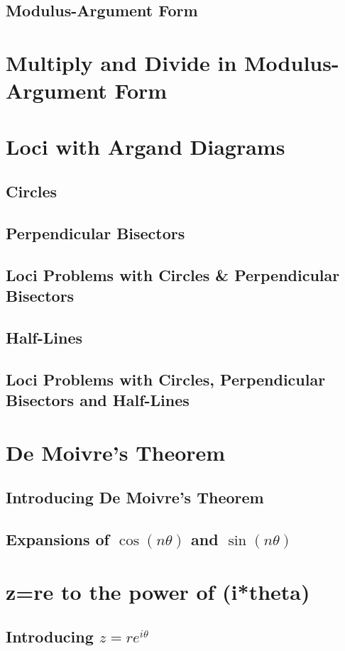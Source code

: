 \documentclass[../maths.tex]{subfiles}
\begin{document}
\subsection*{Modulus-Argument Form}
\section{Multiply and Divide in Modulus-Argument Form}
\section{Loci with Argand Diagrams}
\subsection*{Circles}
\subsection*{Perpendicular Bisectors}
\subsection*{Loci Problems with Circles \& Perpendicular Bisectors}
\subsection*{Half-Lines}
\subsection*{Loci Problems with Circles, Perpendicular Bisectors and Half-Lines}
\section{De Moivre's Theorem}
\subsection*{Introducing De Moivre's Theorem}
\subsection*{Expansions of \texorpdfstring{$\cos(n\theta)$}{cos(n*theta)} and \texorpdfstring{$\sin(n\theta)$}{sin(n*theta)}}
\section{z=re to the power of (i*theta)}
\subsection*{Introducing \texorpdfstring{$z=re^{i\theta}$}{z=re to the power of i*theta}}
\end{document}
